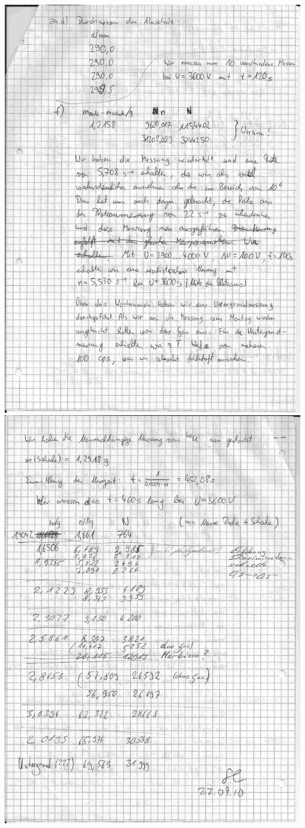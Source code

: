 \includegraphics[width=\linewidth]{Protokoll/protokoll-3.jpg}
\includegraphics[width=\linewidth]{Protokoll/protokoll-4.jpg}